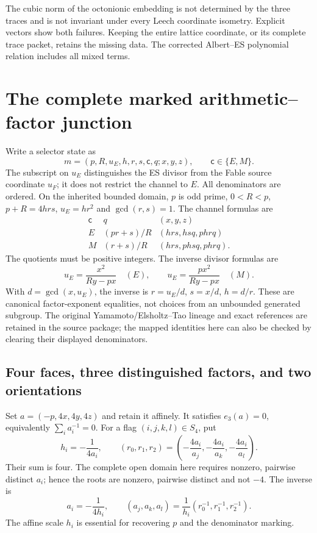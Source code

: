 The cubic norm of the octonionic embedding is not determined by the three traces and is not invariant under every Leech coordinate isometry. Explicit vectors show both failures. Keeping the entire lattice coordinate, or its complete trace packet, retains the missing data. The corrected Albert--ES polynomial relation includes all mixed terms.

\section{The complete marked arithmetic--factor junction}
Write a selector state as
\[
m=(p,R,u_E,h,r,s,\mathsf c,q;x,y,z),\qquad \mathsf c\in\{E,M\}.
\]
The subscript on $u_E$ distinguishes the ES divisor from the Fable source coordinate $u_F$; it does not restrict the channel to $E$. All denominators are ordered. On the inherited bounded domain, $p$ is odd prime, $0<R<p$, $p+R=4hrs$, $u_E=hr^2$ and $\gcd(r,s)=1$. The channel formulas are
\[
\begin{array}{c|c|c}
\mathsf c&q&(x,y,z)\\\hline
E&(pr+s)/R&(hrs,hsq,phrq)\\
M&(r+s)/R&(hrs,phsq,phrq).
\end{array}
\]
The quotients must be positive integers. The inverse divisor formulas are
\[
u_E=\frac{x^2}{Ry-px}\quad(E),\qquad
u_E=\frac{px^2}{Ry-px}\quad(M).
\]
With $d=\gcd(x,u_E)$, the inverse is $r=u_E/d$, $s=x/d$, $h=d/r$. These are canonical factor-exponent equalities, not choices from an unbounded generated subgroup. The original Yamamoto/Elsholtz--Tao lineage and exact references are retained in the source package; the mapped identities here can also be checked by clearing their displayed denominators.

\subsection{Four faces, three distinguished factors, and two orientations}
Set $a=(-p,4x,4y,4z)$ and retain it affinely. It satisfies $e_3(a)=0$, equivalently $\sum_i a_i^{-1}=0$. For a flag $(i,j,k,l)\in S_4$, put
\[
 h_i=-\frac1{4a_i},\qquad
(r_0,r_1,r_2)=\left(-\frac{4a_i}{a_j},-\frac{4a_i}{a_k},-\frac{4a_i}{a_l}\right).
\]
Their sum is four. The complete open domain here requires nonzero, pairwise distinct $a_i$; hence the roots are nonzero, pairwise distinct and not $-4$. The inverse is
\[
a_i=-\frac1{4h_i},\qquad
(a_j,a_k,a_l)=\frac1{h_i}(r_0^{-1},r_1^{-1},r_2^{-1}).
\]
The affine scale $h_i$ is essential for recovering $p$ and the denominator marking.

